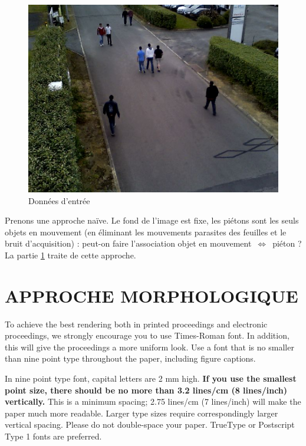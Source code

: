 \documentclass{article}
\begin{document}
	\begin{figure}
		\begin{center}			
			\includegraphics[scale=0.3]{Img/detection_0156}
		\end{center}
		\caption{Données d'entrée}
	\end{figure}
	
	Prenons une approche naïve. Le fond de l'image est fixe, les piétons sont les seuls objets en mouvement (en éliminant les mouvements parasites des feuilles et le bruit d'acquisition) : peut-on faire l'association objet en mouvement~$\Leftrightarrow $~piéton ? La partie \ref{sec:morpho} traite de cette approche.

\section{APPROCHE MORPHOLOGIQUE}
\label{sec:morpho}

To achieve the best rendering both in printed proceedings and electronic proceedings, we
strongly encourage you to use Times-Roman font.  In addition, this will give
the proceedings a more uniform look.  Use a font that is no smaller than nine
point type throughout the paper, including figure captions.

In nine point type font, capital letters are 2 mm high.  {\bf If you use the
smallest point size, there should be no more than 3.2 lines/cm (8 lines/inch)
vertically.}  This is a minimum spacing; 2.75 lines/cm (7 lines/inch) will make
the paper much more readable.  Larger type sizes require correspondingly larger
vertical spacing.  Please do not double-space your paper.  TrueType or
Postscript Type 1 fonts are preferred.
\end{document}
